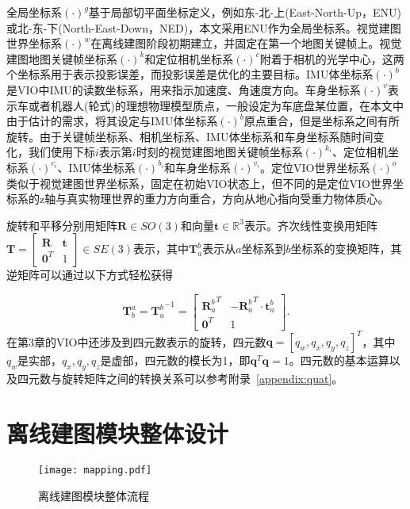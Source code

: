 全局坐标系$(\cdot)^{g}$基于局部切平面坐标定义，例如东-北-上(East-North-Up，ENU)或北-东-下(North-East-Down，NED)，本文采用ENU作为全局坐标系。视觉建图世界坐标系$(\cdot)^{w}$在离线建图阶段初期建立，并固定在第一个地图关键帧上。视觉建图地图关键帧坐标系$(\cdot)^{k}$和定位相机坐标系$(\cdot)^{c}$附着于相机的光学中心，这两个坐标系用于表示投影误差，而投影误差是优化的主要目标。IMU体坐标系$(\cdot)^{b}$是VIO中IMU的读数坐标系，用来指示加速度、角速度方向。车身坐标系$(\cdot)^{v}$表示车或者机器人(轮式)的理想物理模型质点，一般设定为车底盘某位置，在本文中由于估计的需求，将其设定与IMU体坐标系$(\cdot)^{b}$原点重合，但是坐标系之间有所旋转。由于关键帧坐标系、相机坐标系、IMU体坐标系和车身坐标系随时间变化，我们使用下标$i$表示第$i$时刻的视觉建图地图关键帧坐标系$(\cdot)^{k_i}$、定位相机坐标系$(\cdot)^{c_i}$、IMU体坐标系$(\cdot)^{b_i}$和车身坐标系$(\cdot)^{v_i}$。定位VIO世界坐标系$(\cdot)^{o}$类似于视觉建图世界坐标系，固定在初始VIO状态上，但不同的是定位VIO世界坐标系的z轴与真实物理世界的重力方向重合，方向从地心指向受重力物体质心。

旋转和平移分别用矩阵$\symbf{R} \in SO(3)$和向量$\symbf{t} \in \mathbb{R}^{3}$表示。齐次线性变换用矩阵$\symbf{T} = \begin{bmatrix} \symbf{R} & \symbf{t} \\ \symbf{0}^T & 1 \end{bmatrix} \in SE(3)$表示，其中$\symbf{T}_{a}^{b}$表示从$a$坐标系到$b$坐标系的变换矩阵，其逆矩阵可以通过以下方式轻松获得

\begin{equation}
  \symbf{T}^a_b = {\symbf{T}_a^b}^{-1} = \begin{bmatrix} {\symbf{R}_a^b}^T & -{\symbf{R}_a^b}^T\cdot\symbf{t}_a^b \\ \symbf{0}^T & 1 \end{bmatrix}.
\end{equation}
在第3章的VIO中还涉及到四元数表示的旋转，四元数$\symbf{q} = [q_w, q_x, q_y, q_z]^T$，其中$q_w$是实部，$q_x, q_y, q_z$是虚部，四元数的模长为1，即$\symbf{q}^T\symbf{q} = 1$。四元数的基本运算以及四元数与旋转矩阵之间的转换关系可以参考附录~\ref{appendix:quat}。

\section{离线建图模块整体设计}

\begin{figure}
  \centering
  \texttt{[image: mapping.pdf]}
  \caption{离线建图模块整体流程}
  \label{fig:mapping}
\end{figure}

